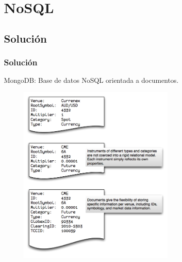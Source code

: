 \documentclass[serif,12pt]{beamer}
\begin{document}
\section{NoSQL}

\subsection{Solución}

\begin{frame}
\frametitle{Solución}

MongoDB: Base de datos NoSQL orientada a documentos.


\begin{figure}
\centering
\includegraphics[width=0.7\textwidth, height=0.7\textheight]{images/document-info.png} 
\label{fig:document}
\end{figure}


\end{frame}
\end{document}
